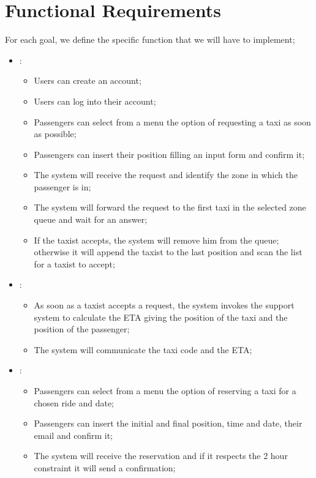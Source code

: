 \section { Functional Requirements}
 
For each goal, we define the specific function that we will have to implement;\\
\begin {itemize}
\item [G1]:
	\begin{itemize}
	\item Users can create an account;
	\item Users can log into their account;
	\item Passengers can select from a menu the option of requesting a taxi as soon as possible; 
	\item Passengers can insert their position filling an input form and confirm it;
	\item The system will receive the request and identify the zone in which the passenger is in;
	\item The system will forward the request to the first taxi in the selected zone queue and wait for an answer;
	\item If the taxist accepts, the system will remove him from the queue; otherwise it will append the taxist to the last position and
scan the list for a taxist to accept;
	\end{itemize}
\item [G2]:
	\begin{itemize}
	\item As soon as a taxist accepts a request, the system invokes the support system to calculate the ETA giving the position of the taxi and the position of the passenger;
	\item The system will communicate the taxi code and the ETA;
	\end{itemize}
\item [G3]:
	\begin{itemize}
	\item Passengers can select from a menu the option of reserving a taxi for a chosen ride and date; 
	\item Passengers can insert the initial and final position, time and date, their email and confirm it;%
	\item The system will receive the reservation and if it respects the 2 hour constraint it will send a confirmation;

\end{itemize}
\end{itemize}
